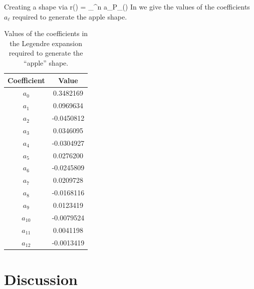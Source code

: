 \documentclass[amsmath,amssymb,10pt,eqsecnum, twocolumn]{revtex4}
\begin{document}
Creating a shape via
\bea
r(\theta) = \sum_{}^n a_{\ell}P_{\ell}(\cos\theta)
\eea
In  we give the values of the coefficients  $a_{\ell}$ required to generate the apple shape.
\begin{table}[!t]
\label{tab:priors}
\begin{center}
\begin{tabular}{|c|c|}  \hline 
Coefficient & Value \\ \hline 
$a_0$ & 0.3482169\\ \hline  
$a_1$ & 0.0969634 \\ \hline  
$a_2$ & -0.0450812 \\ \hline 
$a_3$ &  0.0346095\\ \hline 
$a_4$ & -0.0304927 \\ \hline  
$a_5$ &  0.0276200\\ \hline 
$a_6$ & -0.0245809\\ \hline 
$a_7$ & 0.0209728\\ \hline 
$a_8$ & -0.0168116\\ \hline  
$a_9$ & 0.0123419\\ \hline  
$a_{10}$ & -0.0079524\\ \hline  
$a_{11}$ & 0.0041198\\ \hline  
$a_{12}$ & -0.0013419\\ \hline   
\end{tabular}
\end{center}
\caption{Values of the coefficients in the Legendre expansion required to generate the ``apple'' shape.}
\label{apple_coeffs}
\end{table}%
\section{Discussion}
 
\end{document}
